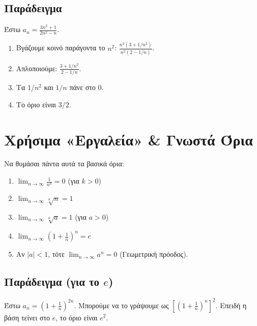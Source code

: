 \documentclass[11pt,a4paper]{article}
\begin{document}
\subsection*{Παράδειγμα}
Έστω $a_n = \frac{3n^2 + 1}{2n^2 - n}$.

\begin{enumerate}
    \item Βγάζουμε κοινό παράγοντα το $n^2$: $\frac{n^2(3 + 1/n^2)}{n^2(2 - 1/n)}$.
    \item Απλοποιούμε: $\frac{3 + 1/n^2}{2 - 1/n}$.
    \item Τα $1/n^2$ και $1/n$ πάνε στο 0.
    \item Το όριο είναι $3/2$.
\end{enumerate}

\section{Χρήσιμα «Εργαλεία» \& Γνωστά Όρια}

Να θυμάσαι πάντα αυτά τα βασικά όρια:
\begin{enumerate}
    \item $\lim_{n \to \infty} \frac{1}{n^k} = 0$ (για $k > 0$)
    \item $\lim_{n \to \infty} \sqrt[n]{n} = 1$
    \item $\lim_{n \to \infty} \sqrt[n]{a} = 1$ (για $a > 0$)
    \item $\lim_{n \to \infty} \left(1 + \frac{1}{n}\right)^n = e$
    \item Αν $|a| < 1$, τότε $\lim_{n \to \infty} a^n = 0$ (Γεωμετρική πρόοδος).
\end{enumerate}

\subsection*{Παράδειγμα (για το $e$)}
Έστω $a_n = \left(1 + \frac{1}{n}\right)^{2n}$.
Μπορούμε να το γράψουμε ως $\left[ \left(1 + \frac{1}{n}\right)^n \right]^2$.
Επειδή η βάση τείνει στο $e$, το όριο είναι $e^2$.
\end{document}
